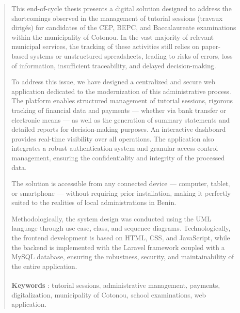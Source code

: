 \newpage
\thispagestyle{empty}
\begin{abstract}
This end-of-cycle thesis presents a digital solution designed to address the shortcomings observed in the management of tutorial sessions (travaux dirigés) for candidates of the CEP, BEPC, and Baccalaureate examinations within the municipality of Cotonou. In the vast majority of relevant municipal services, the tracking of these activities still relies on paper-based systems or unstructured spreadsheets, leading to risks of errors, loss of information, insufficient traceability, and delayed decision-making.

To address this issue, we have designed a centralized and secure web application dedicated to the modernization of this administrative process. The platform enables structured management of tutorial sessions, rigorous tracking of financial data and payments --- whether via bank transfer or electronic means --- as well as the generation of summary statements and detailed reports for decision-making purposes. An interactive dashboard provides real-time visibility over all operations. The application also integrates a robust authentication system and granular access control management, ensuring the confidentiality and integrity of the processed data.

The solution is accessible from any connected device --- computer, tablet, or smartphone --- without requiring prior installation, making it perfectly suited to the realities of local administrations in Benin.

Methodologically, the system design was conducted using the UML language through use case, class, and sequence diagrams. Technologically, the frontend development is based on HTML, CSS, and JavaScript, while the backend is implemented with the Laravel framework coupled with a MySQL database, ensuring the robustness, security, and maintainability of the entire application.

\paragraph{}
\textbf{Keywords} : tutorial sessions, administrative management, payments, digitalization, municipality of Cotonou, school examinations, web application.
\end{abstract}